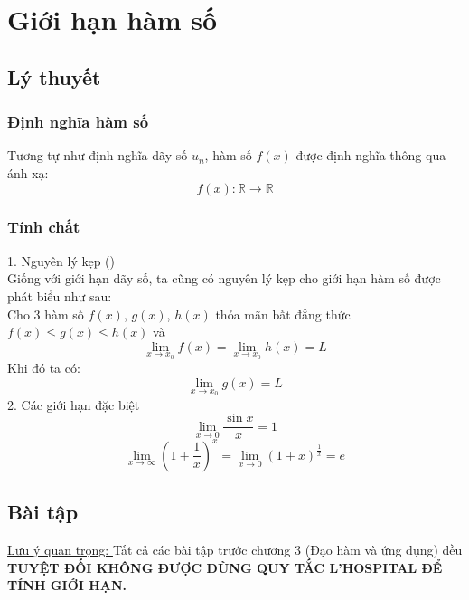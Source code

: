 \section{Giới hạn hàm số}
\subsection{Lý thuyết}
\subsubsection{Định nghĩa hàm số}
Tương tự như định nghĩa dãy số $u_{n}$, hàm số $f(x)$ được định nghĩa thông qua ánh xạ:$$f(x):\mathbb{R}\rightarrow\mathbb{R}$$
\subsubsection{Tính chất}
1. Nguyên lý kẹp ()\\
Giống với giới hạn dãy số, ta cũng có nguyên lý kẹp cho giới hạn hàm số được phát biểu như sau:\\
Cho 3 hàm số $f(x)$, $g(x)$, $h(x)$ thỏa mãn bất đẳng thức $f(x)\leq g(x)\leq h(x)$ và$$\lim_{x\to x_{0}}f(x)=\lim_{x\to x_{0}}h(x)=L$$ Khi đó ta có:
\begin{equation} \label{eq:third}
\lim_{x\to x_{0}}g(x)=L
\end{equation}
2. Các giới hạn đặc biệt
\begin{equation}\label{eq:fourth}
\lim_{x\to0}\frac{\sin{x}}{x}=1
\end{equation}
\begin{equation}\label{eq:fifth}
\lim_{x\to\infty}\left(1+\frac{1}{x}\right)^x=\lim_{x\to0}\left(1+x\right)^\frac{1}{x}=e
\end{equation}
\subsection{Bài tập}
\underline{Lưu ý quan trọng: }Tất cả các bài tập trước chương 3 (Đạo hàm và ứng dụng) đều \textbf{TUYỆT ĐỐI KHÔNG ĐƯỢC DÙNG QUY TẮC L'HOSPITAL ĐỂ TÍNH GIỚI HẠN.}
